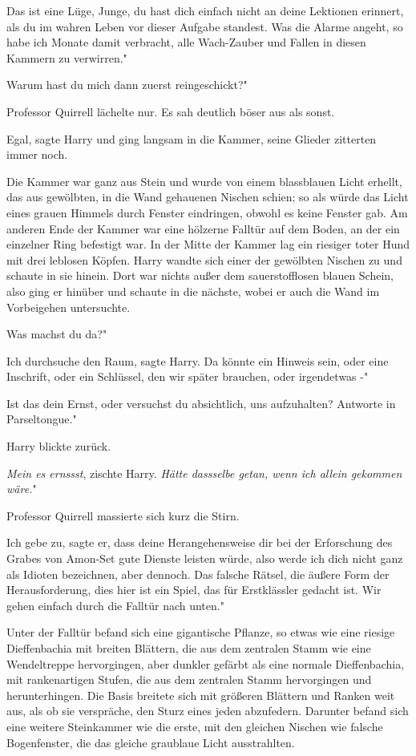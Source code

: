 \glqq Das ist eine Lüge, Junge, du hast dich einfach nicht an deine Lektionen
erinnert, als du im wahren Leben vor dieser Aufgabe standest. Was die Alarme
angeht, so habe ich Monate damit verbracht, alle Wach-Zauber und Fallen in
diesen Kammern zu verwirren."

\glqq Warum hast du mich dann zuerst reingeschickt?"

Professor Quirrell lächelte nur. Es sah deutlich böser aus als sonst.

\glqq Egal\grqq{}, sagte Harry und ging langsam in die Kammer, seine Glieder
zitterten immer noch.

Die Kammer war ganz aus Stein und wurde von einem blassblauen Licht erhellt, das
aus gewölbten, in die Wand gehauenen Nischen schien; so als würde das Licht
eines grauen Himmels durch Fenster eindringen, obwohl es keine Fenster gab. Am
anderen Ende der Kammer war eine hölzerne Falltür auf dem Boden, an der ein
einzelner Ring befestigt war. In der Mitte der Kammer lag ein riesiger toter
Hund mit drei leblosen Köpfen. Harry wandte sich einer der gewölbten Nischen zu
und schaute in sie hinein. Dort war nichts außer dem sauerstofflosen blauen
Schein, also ging er hinüber und schaute in die nächste, wobei er auch die Wand
im Vorbeigehen untersuchte.

\glqq Was machst du da?"

\glqq Ich durchsuche den Raum\grqq{}, sagte Harry. \glqq Da könnte ein Hinweis
sein, oder eine Inschrift, oder ein Schlüssel, den wir später brauchen, oder
irgendetwas -"

\glqq Ist das dein Ernst, oder versuchst du absichtlich, uns aufzuhalten?
Antworte in Parseltongue."

Harry blickte zurück.

\glqq \emph{Mein es ernssst}\grqq{}, zischte Harry. \glqq \emph{Hätte dassselbe
getan, wenn ich allein gekommen wäre.}"

Professor Quirrell massierte sich kurz die Stirn.

\glqq Ich gebe zu\grqq{}, sagte er, \glqq dass deine Herangehensweise dir bei
der Erforschung des Grabes von Amon-Set gute Dienste leisten würde, also werde
ich dich nicht ganz als Idioten bezeichnen, aber dennoch. Das falsche Rätsel,
die äußere Form der Herausforderung, dies hier ist ein Spiel, das für
Erstklässler gedacht ist. Wir gehen einfach durch die Falltür nach unten."

Unter der Falltür befand sich eine gigantische Pflanze, so etwas wie eine
riesige Dieffenbachia mit breiten Blättern, die aus dem zentralen Stamm wie eine
Wendeltreppe hervorgingen, aber dunkler gefärbt als eine normale Dieffenbachia,
mit rankenartigen Stufen, die aus dem zentralen Stamm hervorgingen und
herunterhingen. Die Basis breitete sich mit größeren Blättern und Ranken weit
aus, als ob sie verspräche, den Sturz eines jeden abzufedern. Darunter befand
sich eine weitere Steinkammer wie die erste, mit den gleichen Nischen wie
falsche Bogenfenster, die das gleiche graublaue Licht ausstrahlten.

